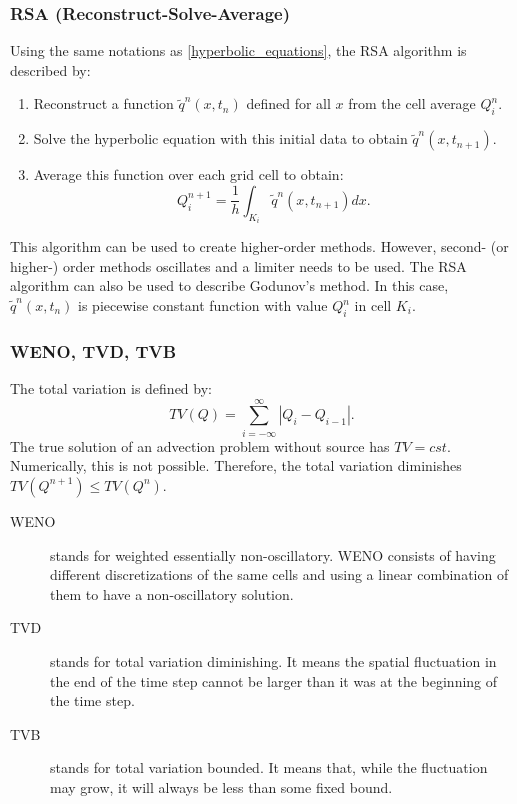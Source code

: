 \subsubsection{RSA (Reconstruct-Solve-Average)}
Using the same notations as \cref{hyperbolic_equations}, the RSA algorithm is
described by:
\begin{enumerate}
  \item Reconstruct a function $\tilde{q}^n(x,t_n)$ defined for all $x$ from the
    cell average $Q_i^n$.
  \item Solve the hyperbolic equation with this initial data to obtain
    $\tilde{q}^n(x,t_{n+1})$.
  \item Average this function over each grid cell to obtain:
    \begin{equation}
      Q_i^{n+1} = \frac{1}{h}\int_{K_i} \tilde{q}^n(x,t_{n+1}) dx.
    \end{equation}
\end{enumerate}
This algorithm can be used to create higher-order methods. However, 
second- (or higher-) order methods oscillates and a limiter needs to be used.
The RSA algorithm can also be used to describe Godunov's method. In this case,
$\tilde{q}^n(x,t_n)$ is piecewise constant function with value $Q_i^n$ in cell
$K_i$.
\subsubsection{WENO, TVD, TVB}
The total variation is defined by:
\begin{equation}
  TV(Q) = \sum_{i=-\infty}^{\infty} |Q_i - Q_{i-1}|.
\end{equation}
The true solution of an advection problem without source has $TV=cst$.
Numerically, this is not possible. Therefore, the total variation diminishes
$TV(Q^{n+1}) \leq TV(Q^n)$.
\begin{description}
  \item[WENO] stands for weighted essentially non-oscillatory. WENO consists
    of having different discretizations of the same cells and using a linear
    combination of them to have a non-oscillatory solution.
  \item[TVD] stands for total variation diminishing. It means the spatial
    fluctuation in the end of the time step cannot be larger than it was at the
    beginning of the time step.
  \item[TVB] stands for total variation bounded. It means that, while the
    fluctuation may grow, it will always be less than some fixed bound.
\end{description}

